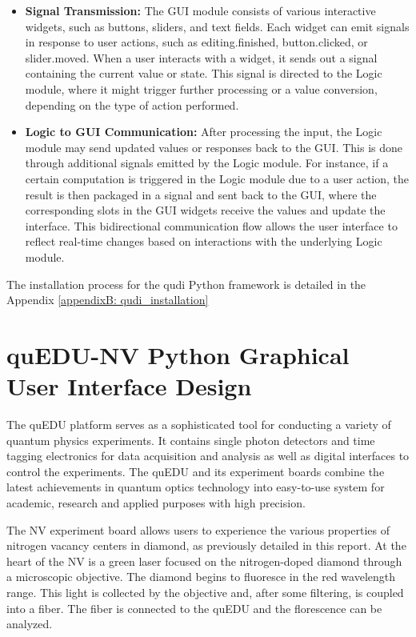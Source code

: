 \begin{itemize}
	\item \textbf{Signal Transmission: }
	The GUI module consists of various interactive widgets, such as buttons, sliders, and text fields. Each widget can emit signals in response to user actions, such as editing.finished, button.clicked, or slider.moved. When a user interacts with a widget, it sends out a signal containing the current value or state. This signal is directed to the Logic module, where it might trigger further processing or a value conversion, depending on the type of action performed.
	
	\item \textbf{Logic to \acs{GUI} Communication: }
	After processing the input, the Logic module may send updated values or responses back to the GUI. This is done through additional signals emitted by the Logic module. For instance, if a certain computation is triggered in the Logic module due to a user action, the result is then packaged in a signal and sent back to the GUI, where the corresponding slots in the GUI widgets receive the values and update the interface. This bidirectional communication flow allows the user interface to reflect real-time changes based on interactions with the underlying Logic module.
	
\end{itemize}

The installation process for the qudi Python framework is detailed in the Appendix \ref{appendixB: qudi_installation}

\section{quEDU-NV Python Graphical User Interface Design}

The \acs{quEDU} platform serves as a sophisticated tool for conducting a variety of quantum physics experiments. It contains single photon detectors and time tagging electronics for data acquisition and analysis as well as digital interfaces to control the experiments. The \acs{quEDU} and its experiment boards combine the latest achievements in quantum optics technology into easy-to-use system for academic, research and applied purposes with high precision.

The \acs{NV} experiment board allows users to experience the various properties of nitrogen vacancy centers in diamond, as previously detailed in this report.  At the heart of the \acs{NV} is a green laser focused on the nitrogen-doped diamond through a microscopic objective. The diamond begins to fluoresce in the red wavelength range. This light is collected by the objective and, after some filtering, is coupled into a fiber. The fiber is connected to the \acs{quEDU} and the florescence can be analyzed. 

